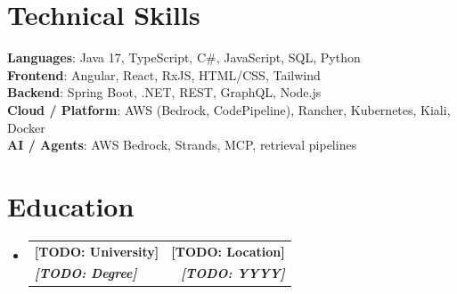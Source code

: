 \documentclass[letterpaper,11pt]{article}
\makeatletter
\newcommand{\TODO}[1]{{\bfseries [TODO: #1]}}
\newcommand{\resumeSubheading}[4]{
  \vspace{-2pt}\item
    \begin{tabular*}{0.97\textwidth}[t]{l@{\extracolsep{\fill}}r}
      \textbf{#1} & #2 \\
      \textit{\small#3} & \textit{\small #4} \\
    \end{tabular*}\vspace{-7pt}
}
\newcommand{\resumeSubHeadingListStart}{\begin{itemize}[leftmargin=0.15in, label={}]}
\newcommand{\resumeSubHeadingListEnd}{\end{itemize}}
\makeatother
\begin{document}
\section{Technical Skills}
\begin{itemize}[leftmargin=0.15in, label={}]
  \small{\item{
    \textbf{Languages}{: Java 17, TypeScript, C\#, JavaScript, SQL, Python} \\
    \textbf{Frontend}{: Angular, React, RxJS, HTML/CSS, Tailwind} \\
    \textbf{Backend}{: Spring Boot, .NET, REST, GraphQL, Node.js} \\
    \textbf{Cloud / Platform}{: AWS (Bedrock, CodePipeline), Rancher, Kubernetes, Kiali, Docker} \\
    \textbf{AI / Agents}{: AWS Bedrock, Strands, MCP, retrieval pipelines} \\
  }}
\end{itemize}

\section{Education}
\resumeSubHeadingListStart
  \resumeSubheading
    {\TODO{University}}{\TODO{Location}}
    {\TODO{Degree}}{\TODO{YYYY}}
\resumeSubHeadingListEnd
\end{document}
